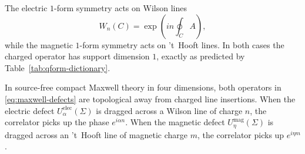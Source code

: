 \begin{remark}\label{rem:maxwell-acts-on-lines}
The electric $1$-form symmetry acts on Wilson lines
\begin{equation*}
W_n(C)=\exp\!\left(i n\oint_C A\right),
\end{equation*}
while the magnetic $1$-form symmetry acts on 't~Hooft lines. In both cases the charged operator has support dimension $1$, exactly as predicted by Table~\ref{tab:qform-dictionary}.
\end{remark}

\begin{proposition}\label{prop:maxwell-one-form}
In source-free compact Maxwell theory in four dimensions, both operators in \eqref{eq:maxwell-defects} are topological away from charged line insertions. When the electric defect $U^{\mathrm{elec}}_{\alpha}(\Sigma)$ is dragged across a Wilson line of charge $n$, the correlator picks up the phase $e^{i\alpha n}$. When the magnetic defect $U^{\mathrm{mag}}_{\eta}(\Sigma)$ is dragged across an 't~Hooft line of magnetic charge $m$, the correlator picks up $e^{i\eta m}$.
\end{proposition}

